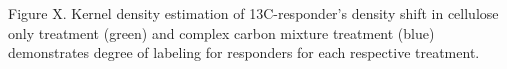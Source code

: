 Figure X. Kernel density estimation of 13C-responder's density shift in cellulose
only treatment (green) and complex carbon mixture treatment (blue) demonstrates degree of labeling for responders for each respective treatment. 
